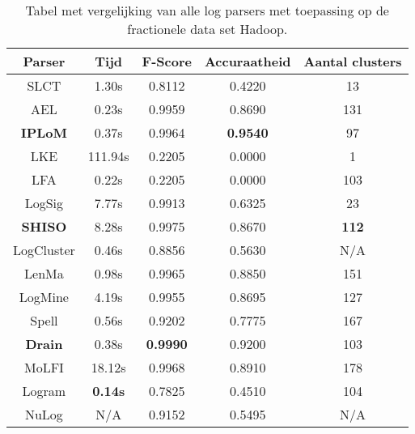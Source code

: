 \begin{table}[!htp]
    \caption{Tabel met vergelijking van alle log parsers met toepassing op de fractionele data set Hadoop.}
    \label{table:Hadoop}
    \begin{center}
        \begin{tabular}{||c | c | c | c | c||} 
            \hline
            Parser & Tijd & F-Score & Accuraatheid & Aantal clusters \\ [0.5ex] 
            \hline\hline
            SLCT & 1.30s & 0.8112 & 0.4220 & 13 \\
            
            AEL & 0.23s & 0.9959 & 0.8690 & 131 \\ 
            
            \textbf{IPLoM} & 0.37s & 0.9964 & \textbf{0.9540} & 97 \\
            
            LKE & 111.94s & 0.2205 & 0.0000 & 1 \\
            
            LFA & 0.22s & 0.2205 & 0.0000 & 103 \\
            
            LogSig & 7.77s & 0.9913 & 0.6325 & 23 \\
            
            \textbf{SHISO} & 8.28s & 0.9975 & 0.8670 & \textbf{112} \\
            
            LogCluster & 0.46s & 0.8856 & 0.5630 & N/A \\
            
            LenMa & 0.98s & 0.9965 & 0.8850 & 151 \\
            
            LogMine & 4.19s & 0.9955 & 0.8695 & 127 \\
            
            Spell & 0.56s & 0.9202 & 0.7775 & 167 \\
            
            \textbf{Drain} & 0.38s & \textbf{0.9990} & 0.9200 & 103\\
            
            MoLFI & 18.12s & 0.9968 & 0.8910 & 178 \\
            
            Logram & \textbf{0.14s} & 0.7825 & 0.4510 & 104 \\
            
            NuLog & N/A & 0.9152 & 0.5495 & N/A \\
            \hline
        \end{tabular}
    \end{center}
\end{table}


